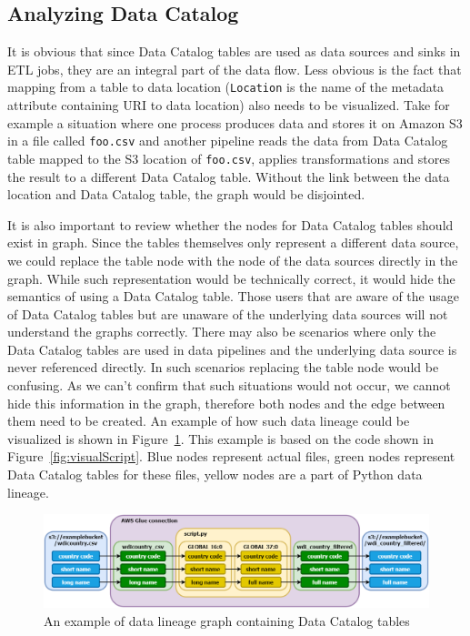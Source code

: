 \subsection{Analyzing Data Catalog}
It is obvious that since Data Catalog tables are used as data sources and sinks in ETL jobs, they are an integral part of the data flow. Less obvious is the fact that mapping from a table to data location (\texttt{Location} is the name of the metadata attribute containing URI to data location) also needs to be visualized. Take for example a situation where one process produces data and stores it on Amazon S3 in a file called \texttt{foo.csv} and another pipeline reads the data from Data Catalog table mapped to the S3 location of \texttt{foo.csv}, applies transformations and stores the result to a different Data Catalog table. Without the link between the data location and Data Catalog table, the graph would be disjointed.
\par
It is also important to review whether the nodes for Data Catalog tables should exist in graph. Since the tables themselves only represent a different data source, we could replace the table node with the node of the data sources directly in the graph. While such representation would be technically correct, it would hide the semantics of using a Data Catalog table. Those users that are aware of the usage of Data Catalog tables but are unaware of the underlying data sources will not understand the graphs correctly. There may also be scenarios where only the Data Catalog tables are used in data pipelines and the underlying data source is never referenced directly. In such scenarios replacing the table node would be confusing. As we can’t confirm that such situations would not occur, we cannot hide this information in the graph, therefore both nodes and the edge between them need to be created. An example of how such data lineage could be visualized is shown in Figure~\ref{fig:catalogLineage}. This example is based on the code shown in Figure~\ref{fig:visualScript}. Blue nodes represent actual files, green nodes represent Data Catalog tables for these files, yellow nodes are a part of Python data lineage.

\begin{figure}[ht]\centering
\includegraphics[width=1.0\textwidth]{img/catalog_lineage.png}
\caption{An example of data lineage graph containing Data Catalog tables}
\label{fig:catalogLineage}
\end{figure}

